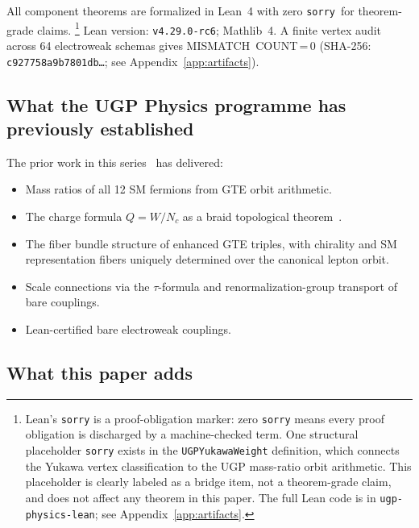 \documentclass[12pt]{article}
\theoremstyle{remark}
\newcommand{\sorry}{\texttt{sorry}}
\begin{document}
All component theorems are formalized in Lean~4 with zero \sorry\ for
theorem-grade claims.%
\footnote{%
  Lean's \texttt{sorry} is a proof-obligation marker: zero \texttt{sorry}
  means every proof obligation is discharged by a machine-checked term.
  One structural placeholder \texttt{sorry} exists in the
  \texttt{UGPYukawaWeight} definition, which connects the Yukawa vertex
  classification to the UGP mass-ratio orbit arithmetic.  This placeholder is
  clearly labeled as a bridge item, not a theorem-grade claim, and does not
  affect any theorem in this paper.  The full Lean code is in
  \texttt{ugp-physics-lean}; see Appendix~\ref{app:artifacts}.}
Lean version: \texttt{v4.29.0-rc6}; Mathlib~4.
A finite vertex audit across 64 electroweak schemas gives MISMATCH~COUNT\,=\,0
(SHA-256: \texttt{c927758a9b7801db\ldots}; see Appendix~\ref{app:artifacts}).

\subsection{What the UGP Physics programme has previously established}

The prior work in this series~\cite{ugp-p01,ugp-p17,ugp-lean} has delivered:
\begin{itemize}
  \item Mass ratios of all 12 SM fermions from GTE orbit arithmetic.
  \item The charge formula $Q = W/N_c$ as a braid topological
    theorem~\cite{ugp-p17}.
  \item The fiber bundle structure of enhanced GTE triples, with chirality and
    SM representation fibers uniquely determined over the canonical lepton orbit.
  \item Scale connections via the $\tau$-formula and renormalization-group
    transport of bare couplings.
  \item Lean-certified bare electroweak couplings.
\end{itemize}

\subsection{What this paper adds}
\end{document}
